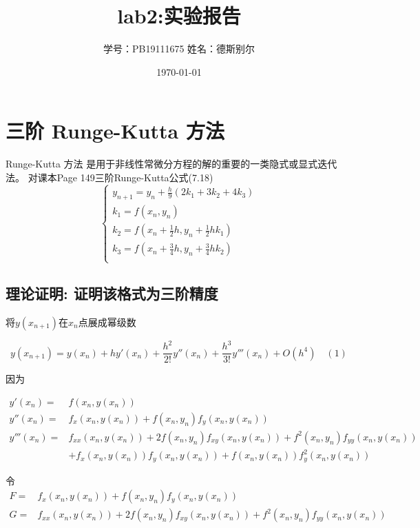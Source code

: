 \documentclass[UTF8]{ctexart}
\title{lab2:实验报告}
\author{学号：PB19111675 姓名：德斯别尔}
\date{\today}
\begin{document}
\maketitle
\section{三阶 Runge-Kutta 方法}
Runge-Kutta 方法 是用于非线性常微分方程的解的重要的一类隐式或显式迭代法。
    对课本Page 149三阶Runge-Kutta公式(7.18)
$$\begin{cases}
        y_{n+1} = y_n + \frac{h}{9}(2k_1 +3k_2+4k_3) \\
        k_1 = f(x_n,y_n) \\
        k_2 = f(x_n+\frac{1}{2}h,y_n+\frac{1}{2}hk_1) \\
        k_3 = f(x_n+\frac{3}{4}h,y_n+\frac{3}{4}hk_2) \\
\end{cases}$$
\subsection{理论证明: 证明该格式为三阶精度}

将$y(x_{n+1})$在$x_n$点展成幂级数

\[ y(x_{n+1})=y(x_{n})+h{y}'(x_{n})+\frac{h^2}{2!}{y}''(x_{n})+\frac{h^3}{3!}{y}'''(x_{n})+O(h^4) \quad (1) \]

因为

\begin{equation*}
    \begin{split}
        {y}'(x_{n})=&f(x_n,y(x_n)) \\
        {y}''(x_{n})=&f_x(x_n,y(x_n))+f(x_n,y_n)f_y(x_n,y(x_n)) \\
        {y}'''(x_{n})=&f_{xx}(x_n,y(x_n))+2f(x_n,y_n)f_{xy}(x_n,y(x_n))+f^2(x_n,y_n)f_{yy}(x_n,y(x_n)) \\
        &+f_{x}(x_n,y(x_n))f_{y}(x_n,y(x_n))+f(x_n,y(x_n))f_{y}^2(x_n,y(x_n))    
    \end{split}
\end{equation*}

令
\begin{equation*}
    \begin{split}
        F =&f_x(x_n,y(x_n))+f(x_n,y_n)f_y(x_n,y(x_n)) \\
        G =&f_{xx}(x_n,y(x_n))+2f(x_n,y_n)f_{xy}(x_n,y(x_n))+f^2(x_n,y_n)f_{yy}(x_n,y(x_n)) \\
    \end{split}
\end{equation*}
\end{document}
